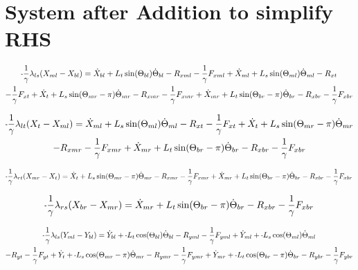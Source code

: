 \documentclass[11pt, landscape]{article}
\newcommand{\mn}{\scalebox{0.7}[1.0]{-}}
\begin{document}
\section{System after Addition to simplify RHS}


\begin{multline}
\mn\frac{1}{\gamma}\lambda_{ls}(X_{ml} - X_{bl}) =
\dot{X}_{bl} + L_{t}\sin(\Theta_{bl})      \dot{\Theta}_{bl} - R_{xml} - \frac{1}{\gamma}F_{xml} + \dot{X}_{ml} + L_{s}\sin(\Theta_{ml}) \dot{\Theta}_{ml} - R_{xt } \\
- \frac{1}{\gamma}F_{xt } + \dot{X}_{t } + L_{s}\sin(\Theta_{mr}-\pi)  \dot{\Theta}_{mr} - R_{xmr}
-\frac{1}{\gamma}F_{xmr} + \dot{X}_{mr} + L_{t}\sin(\Theta_{br}-\pi)  \dot{\Theta}_{br} - R_{xbr} - \frac{1}{\gamma}F_{xbr}
\end{multline}

\begin{multline}
\mn\frac{1}{\gamma}\lambda_{lt}(X_{t } - X_{ml}) =
\dot{X}_{ml} + L_{s}\sin(\Theta_{ml})      \dot{\Theta}_{ml} - R_{xt } - \frac{1}{\gamma}F_{xt } + \dot{X}_{t } + L_{s}\sin(\Theta_{mr}-\pi)  \dot{\Theta}_{mr} \\
- R_{xmr} - \frac{1}{\gamma}F_{xmr} + \dot{X}_{mr} + L_{t}\sin(\Theta_{br}-\pi)  \dot{\Theta}_{br} - R_{xbr} - \frac{1}{\gamma}F_{xbr}
\end{multline}

\begin{equation}
\mn\frac{1}{\gamma}\lambda_{rt}(X_{mr} - X_{t }) =
\dot{X}_{t } + L_{s}\sin(\Theta_{mr}-\pi)  \dot{\Theta}_{mr} - R_{xmr} - \frac{1}{\gamma}F_{xmr}
+ \dot{X}_{mr} + L_{t}\sin(\Theta_{br}-\pi)  \dot{\Theta}_{br} - R_{xbr} - \frac{1}{\gamma}F_{xbr}
\end{equation}

\begin{equation}
\mn\frac{1}{\gamma}\lambda_{rs}(X_{br} - X_{mr}) = 
\dot{X}_{mr} + L_{t}\sin(\Theta_{br}-\pi)  \dot{\Theta}_{br} - R_{xbr} - \frac{1}{\gamma}F_{xbr}
\end{equation}


\begin{multline}
\mn\frac{1}{\gamma}\lambda_{ls}(Y_{ml} - Y_{bl}) =
\dot{Y}_{bl} + \mn L_{t}\cos(\Theta_{bl})      \dot{\Theta}_{bl} - R_{yml} - \frac{1}{\gamma}F_{yml} + \dot{Y}_{ml} + \mn L_{s}\cos(\Theta_{ml}) \dot{\Theta}_{ml} \\
- R_{yt} - \frac{1}{\gamma}F_{yt } + \dot{Y}_{t } + \mn L_{s}\cos(\Theta_{mr}-\pi)  \dot{\Theta}_{mr} - R_{ymr} - \frac{1}{\gamma}F_{ymr} + \dot{Y}_{mr}
+ \mn L_{t}\cos(\Theta_{br}-\pi)  \dot{\Theta}_{br} - R_{ybr} - \frac{1}{\gamma}F_{ybr}
\end{multline}
\end{document}
